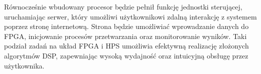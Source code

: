 Równocześnie wbudowany procesor będzie pełnił funkcję jednostki sterującej, uruchamiając serwer, który umożliwi użytkownikowi zdalną interakcję z systemem poprzez stronę internetową.
Strona będzie umożliwiać wprowadzanie danych do FPGA, inicjowanie procesów przetwarzania oraz monitorowanie wyników. Taki podział zadań na układ FPGA i HPS umożliwia
efektywną realizację złożonych algorytmów DSP, zapewniając wysoką wydajność oraz intuicyjną obsługę przez użytkownika.



















